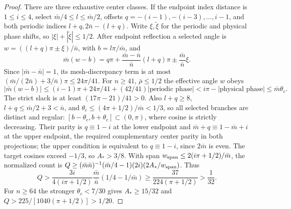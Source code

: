 \begin{proof}
There are three exhaustive center classes.  If the endpoint index
distance is $1\leq i\leq4$, select $\bar{m}/4\leq l\leq \bar{m}/2$, offsets
$q=-(i-1),-(i-3),\ldots,i-1$, and both periodic indices
$l+q,2\bar{n}-(l+q)$.  Write $\xi,\widetilde\xi$ for the periodic and physical phase shifts, so
$|\xi|+|\widetilde\xi|\leq1/2$. After endpoint reflection a selected angle is
$w=((l+q)\pi\pm\xi)/\bar n$, with $b=l\pi/\bar m$, and
\[
 \bar m(w-b)=q\pi+\frac{\bar m-\bar n}{\bar n}(l+q)\pi
                    \pm\frac{\bar m}{\bar n}\xi.
\]
Since $|\bar m-\bar n|=1$, its mesh-discrepancy term is at most
$(\bar m/(2\bar n)+3/\bar n)\pi\leq24\pi/41$.
For $n\geq41$, $\bar\rho\leq1/2$ the effective angle $w$ obeys
\[
 |\bar{m}(w-b)|\leq(i-1)\pi+24\pi/41+(42/41)|\text{periodic phase}|
       <i\pi-|\text{physical phase}|\leq \bar{m}\theta_c.
\]
The strict slack is at least $(17\pi-21)/41>0$.
Also $l+q\geq8$, $l+q\leq \bar{m}/2+3<\bar{n}$, and
$\theta_c\leq(4\pi+1/2)/\bar{m}<1/3$, so all selected branches are distinct
and regular: $[b-\theta_c,b+\theta_c]\subset(0,\pi)$,
where cosine is strictly decreasing. Their parity is $q\equiv1-i$ at the lower endpoint
and $\bar{m}+q\equiv1-\bar{m}+i$ at the upper endpoint, the required complementary
center parity in both projections; the upper condition is equivalent
to $q\equiv1-i$, since $2\bar m$ is even. The target cosines exceed $-1/3$,
so $A_*>3/8$. With span $w_{\rm span}\leq2(i\pi+1/2)/\bar m$,
the normalized count is
$Q\geq(\bar m\bar n)^{-1}(\bar m/4-1)(2i)(2A_*/w_{\rm span})$.
Thus
\[
 Q>\frac{3i}{4(i\pi+1/2)}\frac {\bar{m}}{\bar{n}}(1/4-1/\bar{m})
 \geq\frac{37}{224(\pi+1/2)}>\frac1{32}.
\]
For $n\geq64$ the stronger $\theta_c<7/30$ gives $A_*\geq15/32$ and
$Q>225/[1040(\pi+1/2)]>1/20$.


\end{proof}
